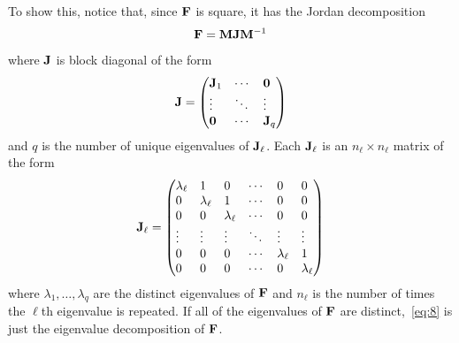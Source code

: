 \documentclass[AER,reviewmode]{tex/AEA}
\begin{document}
To show this, notice that, since $\mathbf{F}$ is square, it has the Jordan
decomposition
\begin{equation}
  \label{eq:8}
  \mathbf{F} = \mathbf{M} \mathbf{J} \mathbf{M}^{-1}
\end{equation}
where $\mathbf{J}$ is block diagonal of the form
\[
\Jm = \begin{pmatrix*}[l]
  \Jm_1 & \cdots & \Omat \\
  \vdots & \ddots & \vdots \\
  \Omat & \cdots & \Jm_q
\end{pmatrix*}
\]
and $q$ is the number of unique eigenvalues of $\mathbf{J}_{\ell}$. Each
$\mathbf{J}_\ell$ is an $n_\ell \times n_\ell$ matrix of the form
\[
\Jm_\ell =
\begin{pmatrix*}[l]
  \lambda_\ell & 1 & 0 & \cdots & 0 & 0 \\
  0 & \lambda_\ell & 1 & \cdots & 0 & 0 \\
  0 & 0 & \lambda_\ell & \cdots & 0 & 0 \\
  \vdots & \vdots & \vdots & \ddots & \vdots & \vdots \\
  0 & 0 & 0 & \cdots & \lambda_\ell & 1 \\
  0 & 0 & 0 & \cdots & 0 & \lambda_\ell
\end{pmatrix*}
\]
where $\lambda_1,\dots,\lambda_q$ are the distinct eigenvalues of $\mathbf{F}$
and $n_\ell$ is the number of times the $\ell$th eigenvalue is
repeated.  If all of the eigenvalues of $\mathbf{F}$ are
distinct,~\eqref{eq:8} is just the eigenvalue decomposition of $\mathbf{F}$.
\end{document}
